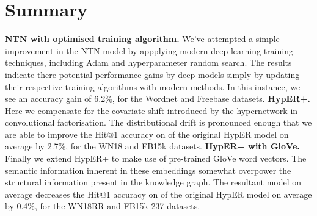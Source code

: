 \section{Summary}

\textbf{NTN with optimised training algorithm.} We've attempted a simple improvement in the NTN model by appplying modern deep learning training techniques, including Adam and hyperparameter random search. The results indicate there potential performance gains by deep models simply by updating their respective training algorithms with modern methods. In this instance, we see an accuracy gain of 6.2\%, for the Wordnet and Freebase datasets. \newline
\noindent \textbf{HypER+.}  Here we compensate for the covariate shift introduced by the hypernetwork in convolutional factorisation. The distributional drift is pronounced enough that we are able to improve the Hit@1 accuracy on of the original HypER model on average by 2.7\%, for the WN18 and FB15k datasets.\newline
\noindent \textbf{HypER+ with GloVe.} Finally we extend HypER+ to make use of pre-trained GloVe word vectors. The semantic information inherent in these embeddings somewhat overpower the structural information present in the knowledge graph. The resultant model on average decreases the Hit@1 accuracy on of the original HypER model on average by 0.4\%, for the WN18RR and FB15k-237 datasets. \newline
